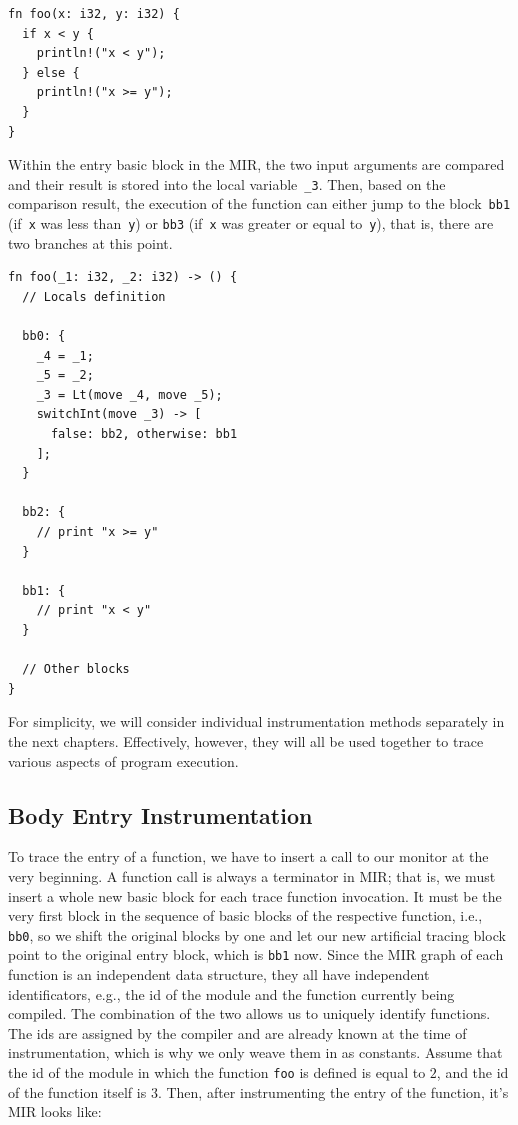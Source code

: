 \documentclass[paper=a4,%
  twoside,%
  BCOR4mm,%
  abstract=true,%
  toc=bibliography,%
  chapterprefix=true,%
  toc=bibliographynumbered,%
  open=right,%
  english,%
  pagesize=pdftex]{scrreprt}
\newcommand{\mir}{\ac{MIR}\xspace}
\begin{document}
\begin{lstlisting}[style=boxed, caption={Example function to instrument}, label=lst:example-function-to-instrument]
fn foo(x: i32, y: i32) {
  if x < y {
    println!("x < y");
  } else {
    println!("x >= y");
  }
}
\end{lstlisting}

Within the entry basic block in the \mir, the two input arguments are compared and their result is stored into the local variable~\texttt{\string_3}. Then, based on the comparison result, the execution of the function can either jump to the block~\texttt{bb1} (if~\texttt{x} was less than~\texttt{y}) or \texttt{bb3} (if~\texttt{x} was greater or equal to~\texttt{y}), that is, there are two branches at this point.
\begin{lstlisting}[style=boxed, caption={MIR of the \texttt{foo} function}, label=lst:mir-of-example-function-to-instrument]
fn foo(_1: i32, _2: i32) -> () {
  // Locals definition

  bb0: {
    _4 = _1;
    _5 = _2;
    _3 = Lt(move _4, move _5);
    switchInt(move _3) -> [
      false: bb2, otherwise: bb1
    ];
  }

  bb2: {
    // print "x >= y"
  }

  bb1: {
    // print "x < y"
  }

  // Other blocks
}
\end{lstlisting}

For simplicity, we will consider individual instrumentation methods separately in the next chapters. Effectively, however, they will all be used together to trace various aspects of program execution.

\subsection{Body Entry Instrumentation}
To trace the entry of a function, we have to insert a call to our monitor at the very beginning. A function call is always a terminator in \mir; that is, we must insert a whole new basic block for each trace function invocation. It must be the very first block in the sequence of basic blocks of the respective function, i.e., \texttt{bb0}, so we shift the original blocks by one and let our new artificial tracing block point to the original entry block, which is \texttt{bb1} now. Since the \mir graph of each function is an independent data structure, they all have independent identificators, e.g., the id of the module and the function currently being compiled. The combination of the two allows us to uniquely identify functions. The ids are assigned by the compiler and are already known at the time of instrumentation, which is why we only weave them in as constants. Assume that the id of the module in which the function \texttt{foo} is defined is equal to $2$, and the id of the function itself is $3$. Then, after instrumenting the entry of the function, it's \mir looks like:
\end{document}
